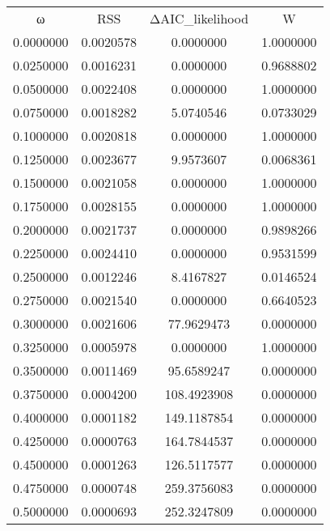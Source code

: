 \begin{tabular}{cccc}
ω & RSS & ΔAIC_likelihood & W\\
0.0000000 & 0.0020578 & 0.0000000 & 1.0000000\\
0.0250000 & 0.0016231 & 0.0000000 & 0.9688802\\
0.0500000 & 0.0022408 & 0.0000000 & 1.0000000\\
0.0750000 & 0.0018282 & 5.0740546 & 0.0733029\\
0.1000000 & 0.0020818 & 0.0000000 & 1.0000000\\
0.1250000 & 0.0023677 & 9.9573607 & 0.0068361\\
0.1500000 & 0.0021058 & 0.0000000 & 1.0000000\\
0.1750000 & 0.0028155 & 0.0000000 & 1.0000000\\
0.2000000 & 0.0021737 & 0.0000000 & 0.9898266\\
0.2250000 & 0.0024410 & 0.0000000 & 0.9531599\\
0.2500000 & 0.0012246 & 8.4167827 & 0.0146524\\
0.2750000 & 0.0021540 & 0.0000000 & 0.6640523\\
0.3000000 & 0.0021606 & 77.9629473 & 0.0000000\\
0.3250000 & 0.0005978 & 0.0000000 & 1.0000000\\
0.3500000 & 0.0011469 & 95.6589247 & 0.0000000\\
0.3750000 & 0.0004200 & 108.4923908 & 0.0000000\\
0.4000000 & 0.0001182 & 149.1187854 & 0.0000000\\
0.4250000 & 0.0000763 & 164.7844537 & 0.0000000\\
0.4500000 & 0.0001263 & 126.5117577 & 0.0000000\\
0.4750000 & 0.0000748 & 259.3756083 & 0.0000000\\
0.5000000 & 0.0000693 & 252.3247809 & 0.0000000\\
\end{tabular}
